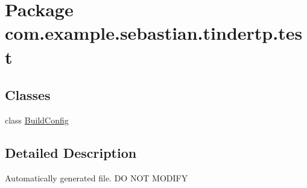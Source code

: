 \hypertarget{namespacecom_1_1example_1_1sebastian_1_1tindertp_1_1test}{}\section{Package com.\+example.\+sebastian.\+tindertp.\+test}
\label{namespacecom_1_1example_1_1sebastian_1_1tindertp_1_1test}
\subsection*{Classes}
\begin{DoxyCompactItemize}
\item 
class \hyperlink{classcom_1_1example_1_1sebastian_1_1tindertp_1_1test_1_1BuildConfig}{Build\+Config}
\end{DoxyCompactItemize}


\subsection{Detailed Description}
Automatically generated file. DO N\+OT M\+O\+D\+I\+FY 